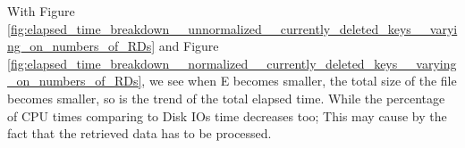 With Figure \ref{fig:elapsed_time_breakdown__unnormalized__currently_deleted_keys__varying_on_numbers_of_RDs} and Figure \ref{fig:elapsed_time_breakdown__normalized__currently_deleted_keys__varying_on_numbers_of_RDs}, we see when E becomes smaller, the total size of the file becomes smaller, so is the trend of the total elapsed time. While the percentage of CPU times comparing to Disk IOs time decreases too; This may cause by the fact that the retrieved data has to be processed.



	 
